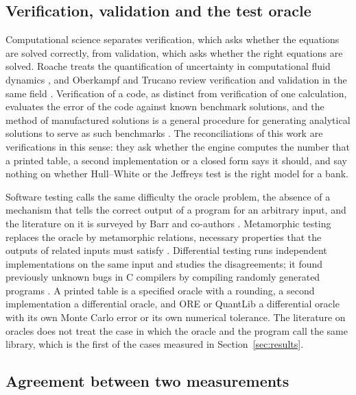 \subsection{Verification, validation and the test oracle}
\label{sec:rw-verification}

Computational science separates verification, which asks whether the equations are solved correctly, from validation, which asks whether the right equations are solved. Roache treats the quantification of uncertainty in computational fluid dynamics \citep{roache1997}, and Oberkampf and Trucano review verification and validation in the same field \citep{oberkampf2002}. Verification of a code, as distinct from verification of one calculation, evaluates the error of the code against known benchmark solutions, and the method of manufactured solutions is a general procedure for generating analytical solutions to serve as such benchmarks \citep{roache2002}. The reconciliations of this work are verifications in this sense: they ask whether the engine computes the number that a printed table, a second implementation or a closed form says it should, and say nothing on whether Hull--White or the Jeffreys test is the right model for a bank.

Software testing calls the same difficulty the oracle problem, the absence of a mechanism that tells the correct output of a program for an arbitrary input, and the literature on it is surveyed by Barr and co-authors \citep{barr2015}. Metamorphic testing replaces the oracle by metamorphic relations, necessary properties that the outputs of related inputs must satisfy \citep{chen2018}. Differential testing runs independent implementations on the same input and studies the disagreements; it found previously unknown bugs in C compilers by compiling randomly generated programs \citep{yang2011}. A printed table is a specified oracle with a rounding, a second implementation a differential oracle, and ORE or QuantLib a differential oracle with its own Monte Carlo error or its own numerical tolerance. The literature on oracles does not treat the case in which the oracle and the program call the same library, which is the first of the cases measured in Section~\ref{sec:results}.

\subsection{Agreement between two measurements}
\label{sec:rw-agreement}

